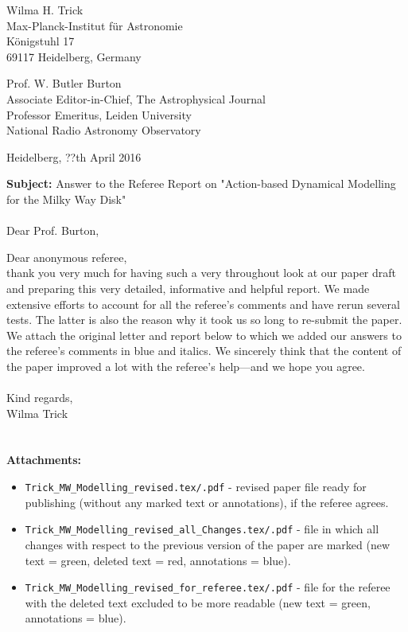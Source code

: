 \documentclass[10pt,a4paper]{article}
\begin{document}
\begin{flushright}
Wilma H. Trick\\
Max-Planck-Institut f\"{u}r Astronomie\\
K\"{o}nigstuhl 17\\
69117 Heidelberg, Germany
\end{flushright}

\noindent Prof. W. Butler Burton\\
Associate Editor-in-Chief, The Astrophysical Journal\\
Professor Emeritus, Leiden University\\
National Radio Astronomy Observatory\\

\begin{flushright}
Heidelberg, ??th April 2016
\end{flushright}

\textbf{Subject:} Answer to the Referee Report on "Action-based Dynamical Modelling for the Milky Way Disk"\\\\

Dear Prof. Burton,

Dear anonymous referee,\\

thank you very much for having such a very throughout look at our paper draft and preparing this very detailed, informative and helpful report. We made extensive efforts to account for all the referee's comments and have rerun several tests. The latter is also the reason why it took us so long to re-submit the paper. We attach the original letter and report below to which we added our answers to the referee's comments in blue and italics. We sincerely think that the content of the paper improved a lot with the referee's help---and we hope you agree.\\\\
Kind regards,\\
Wilma Trick\\\\\\

\noindent\textbf{Attachments:}
\begin{itemize}
\item \texttt{Trick{\_}MW{\_}Modelling{\_}revised.tex/.pdf} - revised paper file ready for publishing (without any marked text or annotations), if the referee agrees.
\item \texttt{Trick{\_}MW{\_}Modelling{\_}revised{\_}all{\_}Changes.tex/.pdf} - file in which all changes with respect to the previous version of the paper are marked (new text = green, deleted text = red, annotations = blue).
\item \texttt{Trick{\_}MW{\_}Modelling{\_}revised{\_}for{\_}referee.tex/.pdf} - file for the referee with the deleted text excluded to be more readable (new text = green, annotations = blue).
\end{itemize}
\end{document}
